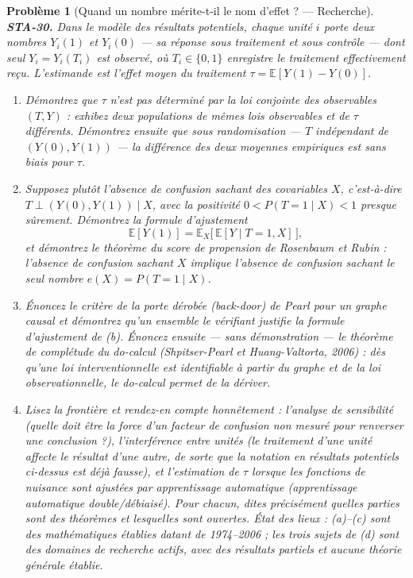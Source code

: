 \documentclass[11pt]{article}
\newtheorem{problem}{Problème}
\begin{document}
\begin{problem}[{Quand un nombre mérite-t-il le nom d'effet ? --- Recherche}]
\textbf{STA-30.} Dans le modèle des résultats potentiels, chaque unité $ i $ porte deux
nombres $ Y_i(1) $ et $ Y_i(0) $ --- sa réponse sous traitement et sous contrôle --- dont seul
$ Y_i = Y_i(T_i) $ est observé, où $ T_i \in \{0,1\} $ enregistre le traitement effectivement
reçu. L'estimande est l'effet moyen du traitement
$ \tau = \mathbb{E}[Y(1) - Y(0)] $.
\begin{enumerate}
\item[(a)] Démontrez que $ \tau $ n'est \textit{pas} déterminé par la loi conjointe des observables
$ (T, Y) $ : exhibez deux populations de mêmes lois observables et de $ \tau $ différents.
Démontrez ensuite que sous randomisation --- $ T $ indépendant de $ (Y(0), Y(1)) $ --- la différence
des deux moyennes empiriques est sans biais pour $ \tau $.
\item[(b)] Supposez plutôt l'absence de confusion sachant des covariables $ X $, c'est-à-dire
$ T \perp (Y(0), Y(1)) \mid X $, avec la positivité
$ 0 <P(T=1 \mid X) <1 $ presque sûrement. Démontrez la formule d'ajustement
\[ \mathbb{E}[Y(1)] = \mathbb{E}_X\big[\, \mathbb{E}[Y \mid T=1, X] \,\big] , \]
et démontrez le théorème du score de propension de Rosenbaum et Rubin : l'absence de confusion
sachant $ X $ implique l'absence de confusion sachant le seul nombre
$ e(X) = P(T = 1 \mid X) $.
\item[(c)] Énoncez le critère de la porte dérobée (back-door) de Pearl pour un graphe causal et démontrez
qu'un ensemble le vérifiant justifie la formule d'ajustement de (b). Énoncez ensuite --- sans
démonstration --- le théorème de complétude du do-calcul (Shpitser-Pearl et Huang-Valtorta, 2006) :
dès qu'une loi interventionnelle est identifiable à partir du graphe et de la loi observationnelle,
le do-calcul permet de la dériver.
\item[(d)] Lisez la frontière et rendez-en compte honnêtement : l'analyse de sensibilité (quelle doit être
la force d'un facteur de confusion non mesuré pour renverser une conclusion ?), l'interférence entre
unités (le traitement d'une unité affecte le résultat d'une autre, de sorte que la notation en
résultats potentiels ci-dessus est déjà fausse), et l'estimation de $ \tau $ lorsque les
fonctions de nuisance sont ajustées par apprentissage automatique (apprentissage automatique
double/débiaisé). Pour chacun, dites précisément quelles parties sont des théorèmes et lesquelles
sont ouvertes.
\textit{État des lieux : (a)--(c) sont des mathématiques établies datant de 1974--2006 ; les trois sujets
de (d) sont des domaines de recherche actifs, avec des résultats partiels et aucune théorie générale
établie.}
\end{enumerate}

\end{problem}
\end{document}
